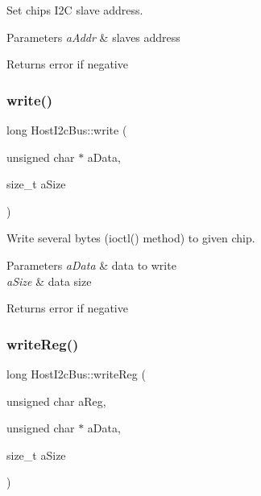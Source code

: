 Set chip\textquotesingle{}s I2C slave address. 


\begin{DoxyParams}{Parameters}
{\em a\+Addr} & slave\textquotesingle{}s address\\
\hline
\end{DoxyParams}
\begin{DoxyReturn}{Returns}
error if negative 
\end{DoxyReturn}
\mbox{\label{classHostI2cBus_a23f6aad4bad6aa15170f02abe1348c33}} 
\subsubsection{\texorpdfstring{write()}{write()}}
{\footnotesize\ttfamily long Host\+I2c\+Bus\+::write (\begin{DoxyParamCaption}\item[{unsigned char $\ast$}]{a\+Data,  }\item[{size\+\_\+t}]{a\+Size }\end{DoxyParamCaption})}



Write several bytes (ioctl() method) to given chip. 


\begin{DoxyParams}{Parameters}
{\em a\+Data} & data to write \\
\hline
{\em a\+Size} & data size\\
\hline
\end{DoxyParams}
\begin{DoxyReturn}{Returns}
error if negative 
\end{DoxyReturn}
\mbox{\label{classHostI2cBus_a6f7a8cf477287727ee6861bfc8007788}} 
\subsubsection{\texorpdfstring{write\+Reg()}{writeReg()}}
{\footnotesize\ttfamily long Host\+I2c\+Bus\+::write\+Reg (\begin{DoxyParamCaption}\item[{unsigned char}]{a\+Reg,  }\item[{unsigned char $\ast$}]{a\+Data,  }\item[{size\+\_\+t}]{a\+Size }\end{DoxyParamCaption})}



